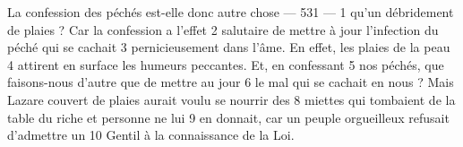 La confession des péchés est-elle donc autre chose	 
 	--- 531 ---	 
1	 	qu'un débridement de plaies ? Car la confession a l'effet	 
2	 	salutaire de mettre à jour l'infection du péché qui se cachait	 
3	 	pernicieusement dans l'âme. En effet, les plaies de la peau	 
4	 	attirent en surface les humeurs peccantes. Et, en confessant	 
5	 	nos péchés, que faisons-nous d'autre que de mettre au jour	 
6	 	le mal qui se cachait en nous ?
Mais Lazare couvert de plaies aurait voulu se nourrir des	 
8	 	miettes qui tombaient de la table du riche et personne ne lui	 
9	 	en donnait, car un peuple orgueilleux refusait d'admettre un	 
10	 	Gentil à la connaissance de la Loi.